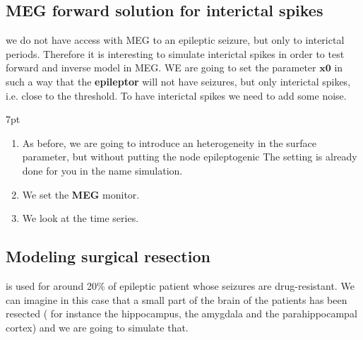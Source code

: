 \documentclass{tufte-handout}
\newenvironment{simulation}{%
  \def\FrameCommand{%
    \hspace{1pt}%
    {\color{ForestGreen}\vrule width 2pt}%
    {\color{simulationshade}\vrule width 4pt}%
    \colorbox{simulationshade}%
  }%
  \MakeFramed{\advance\hsize-\width\FrameRestore}%
  \noindent\hspace{-4.55pt}%
  \begin{adjustwidth}{}{7pt}%
  \vspace{2pt}\vspace{2pt}%
}
{%
  \vspace{2pt}\end{adjustwidth}\endMakeFramed%
}
\begin{document}
\subsection{MEG forward solution for interictal spikes}

 we do not have access with MEG to an epileptic seizure, but only to interictal periods.
Therefore it is interesting to simulate interictal spikes in order to test forward and inverse model in MEG.
WE are going to set the parameter $\mathbf{x0}$ in such a way that the \textbf{epileptor} will not have seizures, but only interictal spikes, 
i.e. close to the threshold. To have interictal spikes we need to add some noise.

  \begin{simulation}
  \begin{enumerate}
  \item As before, we are going to introduce an heterogeneity in the surface parameter, but without putting the node epileptogenic
  The setting is already done for you in the name simulation.
  \item We set the \textbf{MEG} monitor.
  \item We look at the time series.
\end{enumerate}
\end{simulation}

\subsection{Modeling surgical resection}

 is used for around 20\% of epileptic patient whose seizures are drug-resistant. We can imagine in this case that a small part of the brain of the patients 
has been resected ( for instance the hippocampus, the amygdala and the parahippocampal cortex) and 
we are going to simulate that.
\end{document}
